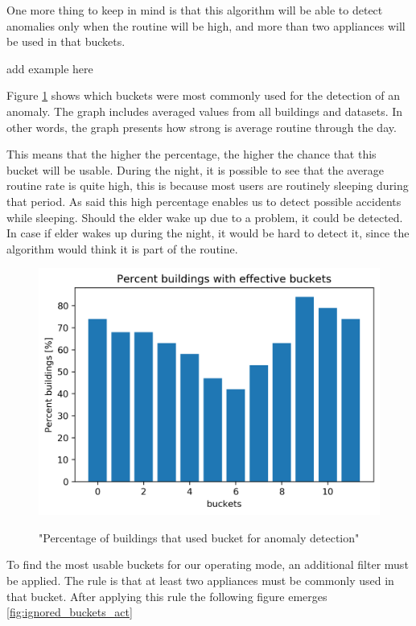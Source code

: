 One more thing to keep in mind is that this algorithm will be able to detect anomalies only when
the routine will be high, and more than two appliances will be used in that buckets.

add example here

Figure \ref{fig:ignored_buckets_22} shows which buckets were most commonly used for the detection of an anomaly.
The graph includes averaged values from all buildings and datasets. 
In other words, the graph presents how strong is average routine through the day.

This means that the higher the percentage, the higher the chance that this bucket will be usable.
During the night, it is possible to see that the average routine rate is quite high,
this is because most users are routinely sleeping during that period. 
As said this high percentage enables us to detect possible accidents while sleeping.
Should the elder wake up due to a problem, it could be detected.
In case if elder wakes up during the night, it would be hard to detect it, since the algorithm would think it is part of the routine.

\begin{figure}[H]
	\centering
	\caption{"Percentage of buildings that used bucket for anomaly detection"}
	\includegraphics[width=.8\textwidth]{Figures/EC/ignored_buckets_dist.png}
	\label{fig:ignored_buckets_22}
\end{figure}

To find the most usable buckets for our operating mode, an additional filter must be applied.
The rule is that at least two appliances must be commonly used in that bucket. 
After applying this rule the following figure emerges \ref{fig:ignored_buckets_act}

